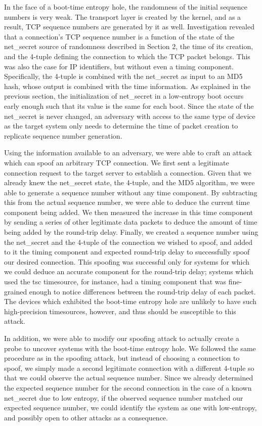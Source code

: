 In the face of a boot-time entropy hole, the randomness of the initial sequence numbers is very weak. The transport layer is created by the kernel, and as a result, TCP sequence numbers are generated by it as well.  Investigation revealed that a connection's TCP sequence number is a function of the state of the net\_secret source of randomness described in Section 2, the time of its creation, and the 4-tuple defining the connection to which the TCP packet belongs. This was also the case for IP identifiers, but without even a timing component.  Specifically, the 4-tuple is combined with the net\_secret as input to an MD5 hash, whose output is combined with the time information.  As explained in the previous section, the initialization of net\_secret in a low-entropy boot occurs early enough such that its value is the same for each boot. Since the state of the net\_secret is never changed, an adversary with access to the same type of device as the target system only needs to determine the time of packet creation to replicate sequence number generation.

Using the information available to an adversary, we were able to craft an attack which can spoof an arbitrary TCP connection. We first sent a legitimate connection request to the target server to establish a connection.  Given that we already knew the net\_secret state, the 4-tuple, and the MD5 algorithm, we were able to generate a sequence number without any time component.  By subtracting this from the actual sequence number, we were able to deduce the current time component being added.  We then measured the increase in this time component by sending a series of other legitimate data packets to deduce the amount of time being added by the round-trip delay.  Finally, we created a sequence number using the net\_secret and the 4-tuple of the connection we wished to spoof, and added to it the timing component and expected round-trip delay to successfully spoof our desired connection.  This spoofing was successful only for systems for which we could deduce an accurate component for the round-trip delay; systems which used the tsc timesource, for instance, had a timing component that was fine-grained enough to notice differences between the round-trip delay of each packet.  The devices which exhibited the boot-time entropy hole are unlikely to have such high-precision timesources, however, and thus should be susceptible to this attack.  

In addition, we were able to modify our spoofing attack to actually create a probe to uncover systems with the boot-time entropy hole.  We followed the same procedure as in the spoofing attack, but instead of choosing a connection to spoof, we simply made a second legitimate connection with a different 4-tuple so that we could observe the actual sequence number.  Since we already determined the expected sequence number for the second connection in the case of a known net\_secret due to low entropy, if the observed sequence number matched our expected sequence number, we could identify the system as one with low-entropy, and possibly open to other attacks as a consequence.   
